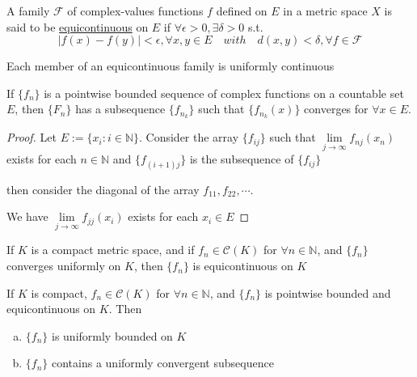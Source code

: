 A family  $ \mathscr{F} $ of complex-values functions  $ f  $ defined on  $ E  $ in a metric space  $ X  $ is said to be \underline{equicontinuous} on  $ E  $ if  $ \forall \epsilon>0, \exists \delta>0  $ s.t.
\[|f(x)-f(y)|<\epsilon,\forall x,y\in E \quad with\quad d(x,y)<\delta,\forall f\in \mathscr{F}\] 
\begin{remark}
    Each member of an equicontinuous family is uniformly continuous
\end{remark}
\begin{theorem}
    If  $ \{f_n \} $ is a pointwise bounded sequence of complex functions on a countable set  $ E  $, then  $ \{F_n \} $ has a subsequence
     $ \{f_{n_k}\} $ such that  $ \{f_{n_k}(x)\} $ converges for  $ \forall x\in E $.   
\end{theorem}
\begin{proof}
    Let  $ E:=\{x_i:i\in\mathbb{N }\}  $. Consider  the array $ \{f_{ij}\} $ such that  $ \lim\limits_{j\to \infty } f_{nj}(x_n)  $ exists for each  $ n\in\mathbb{N} $
    and  $ \{f_{(i+1)j}\} $  is the subsequence of  $ \{f_{ij}\} $  

    then consider the diagonal of the array  $ f_{11},f_{22},\cdots  $. 

    We have  $ \lim\limits_{j\to\infty } f_{jj}(x_i)  $ exists for each  $ x_i\in E  $ 
\end{proof}
\begin{theorem}
    If  $ K  $ is a compact metric space, and if  $ f_n\in \mathscr{C} (K)  $ for  $ \forall n\in\mathbb{N } $, and  $ \{f_n \} $ converges uniformly on  $ K  $, then  $ \{f_n \} $ is equicontinuous on  $ K  $ 

\end{theorem}
\begin{theorem}
    If  $ K  $ is compact,  $ f_n\in  \mathscr{C}(K)  $ for  $ \forall n\in\mathbb{N } $, and  $ \{f_n \} $ is pointwise bounded and equicontinuous on $ K  $.
    Then 
    \begin{enumerate}[(a)]
        \item  $ \{f_n \} $ is uniformly bounded on  $ K  $
        \item  $ \{f_n \} $ contains a uniformly convergent subsequence 
    \end{enumerate} 
\end{theorem}
